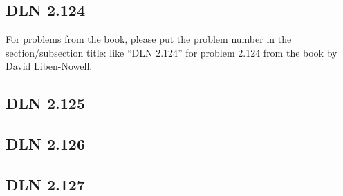 \documentclass[titlepage]{article}
\begin{document}
\subsection{DLN 2.124}

For problems from the book, please put the problem number in the section/subsection title: like ``DLN 2.124'' for problem 2.124 from the book by David Liben-Nowell.

\subsection{DLN 2.125}

\subsection{DLN 2.126}

\subsection{DLN 2.127}
\end{document}
